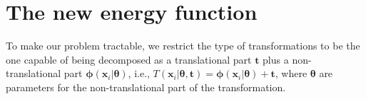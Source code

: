 \documentclass[11pt,bezier,]{article}
\begin{document}
\section{
The new energy function 
\label{sect:energy}}


\addtocounter{MaxMatrixCols}{12}

To make our problem tractable,
we restrict the type of transformations
to be the one capable of being decomposed as 
a translational part $\mathbf t$
plus a non-translational part $\boldsymbol\phi({\mathbf x}_i|\boldsymbol\theta)$,
i.e.,  
$T({\mathbf x}_i|{\boldsymbol\theta},{\mathbf t})= \boldsymbol\phi({\mathbf x}_i|\boldsymbol\theta) + {\mathbf t} $,
where  $\boldsymbol\theta$ are parameters for the non-translational part of the transformation.
\end{document}
